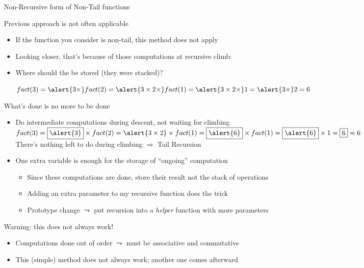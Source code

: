 \begin{frame}{Non-Recursive form of Non-Tail functions}
  \begin{block}{Previous approach is not often applicable}
  \begin{itemize}
  \item If the function you consider is non-tail, this method does not apply
  \item Looking closer, that's because of those computations at recursive
    climb:
  \item Where should the  be stored (they were stacked)?
    
    $fact(3)=\alert{3\times} fact(2)=\alert{3\times 2\times}
    fact(1)=\alert{3\times 2\times} 1=\alert{3\times} 2=6$ 
  \end{itemize}
\end{block}\vspace{-.7\baselineskip}
\begin{block}{What's done is no more to be done}
  \begin{itemize}
  \item Do intermediate computations during descent, not waiting for climbing\\[2pt]

    $fact(3)=\fbox{\alert{3}}\times fact(2)=\alert{3\times 2}\times
    fact(1)=\fbox{\alert{6}}\times fact(1)=\fbox{\alert{6}}\times
    1=\fbox{6}=6$\\[2pt]
    There's nothing left to do during climbing $\Rightarrow$ Tail Recursion

  \item One extra variable is enough for the storage of ``ongoing'' computation
    \begin{itemize}
    \item Since these computations are done, store their result not the
      stack of operations
    \item Adding an extra parameter to my recursive function does the trick
    \item Prototype change $\leadsto$ put recursion into a \textit{helper}
      function with more parameters
    \end{itemize}
  \end{itemize}
\end{block}\vspace{-.7\baselineskip}

\begin{block}{\alert{Warning:} this does not always work!}
  \begin{itemize}
  \item Computations done out of order $\leadsto$ must be \alert{associative}
    and \alert{commutative}
  \item This (simple) method does not always work; another one comes afterward
  \end{itemize}
  \end{block}
\end{frame}
